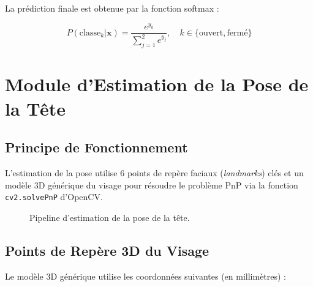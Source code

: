La prédiction finale est obtenue par la fonction softmax :

\begin{equation}
P(\text{classe}_k | \mathbf{x}) = \frac{e^{y_k}}{\sum_{j=1}^{2} e^{y_j}}, \quad k \in \{\text{ouvert}, \text{fermé}\}
\label{eq:softmax}
\end{equation}

\section{Module d'Estimation de la Pose de la Tête}

\subsection{Principe de Fonctionnement}

L'estimation de la pose utilise 6 points de repère faciaux (\textit{landmarks}) clés et un modèle 3D générique du visage pour résoudre le problème PnP via la fonction \texttt{cv2.solvePnP} d'OpenCV.

\begin{figure}[H]
\centering
{}
\caption{Pipeline d'estimation de la pose de la tête.}
\label{fig:head_pose_pipeline}
\end{figure}

\subsection{Points de Repère 3D du Visage}

Le modèle 3D générique utilise les coordonnées suivantes (en millimètres) :

